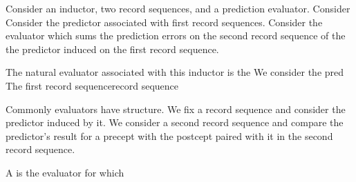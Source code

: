 Consider an inductor, two record
sequences, and a prediction evaluator.
Consider
Consider the predictor
associated with first record sequences.
Consider the evaluator which
sums the prediction errors on the
second record sequence of the
the predictor induced on the first record
sequence.

The natural evaluator associated with
this inductor is the
We consider the pred
The first record sequencerecord sequence

Commonly evaluators have
structure.
We fix a record sequence
and consider the predictor
induced by it.
We consider a second
record sequence
and compare the predictor's
result for a precept with
the postcept paired with it
in the second record sequence.


A  is
the evaluator for which
\strats
